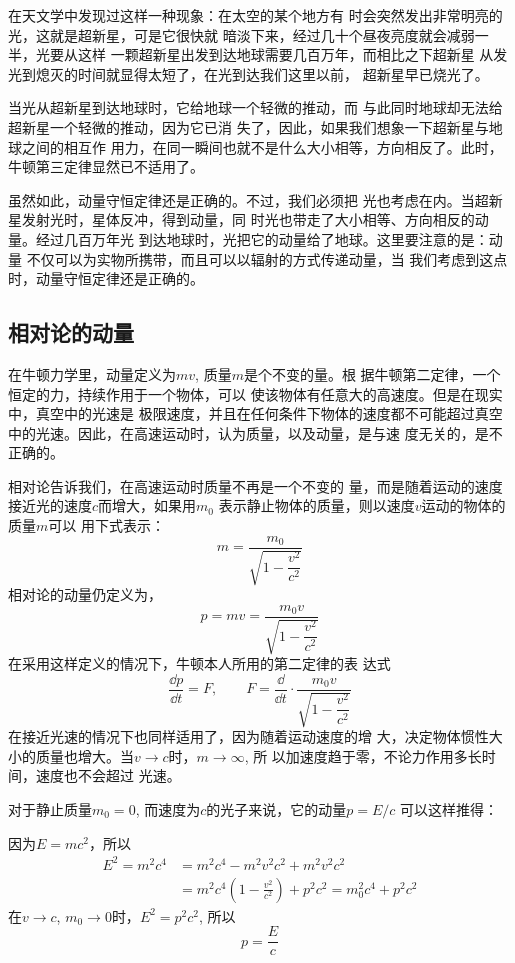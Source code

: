 在天文学中发现过这样一种现象：在太空的某个地方有
时会突然发出非常明亮的光，这就是超新星，可是它很快就
暗淡下来，经过几十个昼夜亮度就会减弱一半，光要从这样
一颗超新星出发到达地球需要几百万年，而相比之下超新星
从发光到熄灭的时间就显得太短了，在光到达我们这里以前，
超新星早已烧光了。

当光从超新星到达地球时，它给地球一个轻微的推动，而
与此同时地球却无法给超新星一个轻微的推动，因为它已消
失了，因此，如果我们想象一下超新星与地球之间的相互作
用力，在同一瞬间也就不是什么大小相等，方向相反了。此时，
牛顿第三定律显然已不适用了。

虽然如此，动量守恒定律还是正确的。不过，我们必须把
光也考虑在内。当超新星发射光时，星体反冲，得到动量，同
时光也带走了大小相等、方向相反的动量。经过几百万年光
到达地球时，光把它的动量给了地球。这里要注意的是：动量
不仅可以为实物所携带，而且可以以辐射的方式传递动量，当
我们考虑到这点时，动量守恒定律还是正确的。

\subsection{相对论的动量}

在牛顿力学里，动量定义为$mv$, 质量$m$是个不变的量。根
据牛顿第二定律，一个恒定的力，持续作用于一个物体，可以
使该物体有任意大的高速度。但是在现实中，真空中的光速是
极限速度，并且在任何条件下物体的速度都不可能超过真空
中的光速。因此，在高速运动时，认为质量，以及动量，是与速
度无关的，是不正确的。

相对论告诉我们，在高速运动时质量不再是一个不变的
量，而是随着运动的速度接近光的速度$c$而增大，如果用$m_0$
表示静止物体的质量，则以速度$v$运动的物体的质量$m$可以
用下式表示：
\[m=\frac{m_0}{\sqrt{1-\dfrac{v^2}{c^2}}}\]
相对论的动量仍定义为，
\[p=mv=\frac{m_0v}{\sqrt{1-\dfrac{v^2}{c^2}}}\]
在采用这样定义的情况下，牛顿本人所用的第二定律的表
达式
\[\frac{\dd p}{\dd t}=F,\qquad F=\frac{\dd}{\dd t}\cdot\frac{m_0v}{\sqrt{1-\dfrac{v^2}{c^2}}}\]
在接近光速的情况下也同样适用了，因为随着运动速度的增
大，决定物体惯性大小的质量也增大。当$v\to c$时，$m\to \infty$, 所
以加速度趋于零，不论力作用多长时间，速度也不会超过
光速。

对于静止质量$m_0=0$, 而速度为$c$的光子来说，它的动量$p=E/c$
可以这样推得：

因为$E=mc^2$，所以
\[\begin{split}
    E^2=m^2c^4&=m^2c^4-m^2v^2c^2+m^2v^2c^2\\
    &=m^2c^4\left(1-\frac{v^2}{c^2}\right)+p^2c^2=m^2_0c^4+p^2c^2
\end{split}\]
在$v\to c$, $m_0\to 0$时，$E^2=p^2c^2$, 所以
\[p=\frac{E}{c}\]


